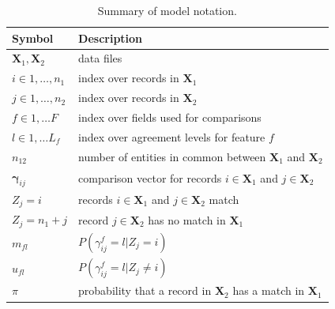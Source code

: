 \documentclass[ba]{imsart}
\begin{document}
%


\begin{table}[t!]
	\centering
	\begin{tabular}[t!]{ll}
		Symbol & Description \\
		\hline
		$\bm{X}_1, \bm{X}_2$ & data files\\
		$i \in 1, \ldots, n_1 $ & index over records in $\bm{X}_1$\\
		$j \in 1, \ldots, n_2 $ & index over records in $\bm{X}_2$\\
		$f \in 1, \ldots F$ & index over fields used for comparisons \\
		$l \in 1, \ldots L_f$ & index over agreement levels for feature $f$ \\
		$n_{12}$ & number of entities in common between $\bm{X}_1$ and $\bm{X}_2$\\
		$\bm{\gamma}_{ij}$ & comparison vector for records $i \in \bm{X}_1$ and $j \in \bm{X}_2$ \\
		$Z_j = i$ & records $i \in \bm{X}_1$ and $j \in \bm{X}_2$ match \\
		$Z_j = n_1 + j$ & record $j \in \bm{X}_2$ has no match in $\bm{X}_1$ \\
		$m_{fl}$ & $P(\gamma_{ij}^f = l | Z_j = i)$ \\
		$u_{fl}$ & $P(\gamma_{ij}^f = l | Z_j \neq i)$ \\
		$\pi$ & probability that a record in $\bm{X}_2$ has a match in $\bm{X}_1$ \\
		\hline
	\end{tabular}\caption{Summary of model notation.}\label{table_notation_1}
\end{table}
\end{document}
